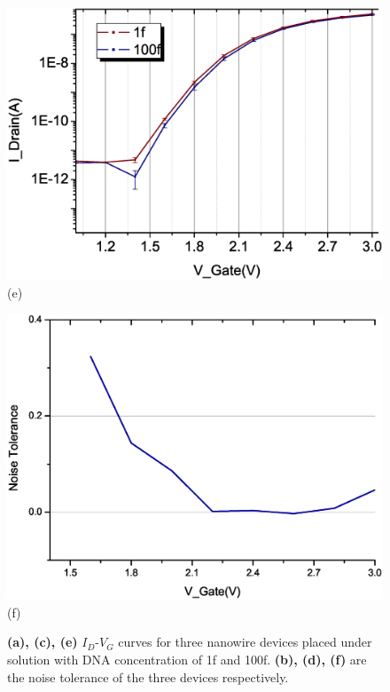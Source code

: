 \begin{figure}[!hbt]
\begin{minipage}[t][20cm][t]{1\textwidth}
\begin{minipage}[t]{0.5\textwidth}
            \includegraphics[scale=0.3]{images/chapter3/208_devices/L2-12_log.eps}
            (e)
        \end{minipage}
        \hfill
        \begin{minipage}[t]{0.5\textwidth}
            \raggedleft
            \includegraphics[scale=0.3]{images/chapter3/208_devices/L2-12_margin.eps}
            \centering
            (f)
        \end{minipage}
    \end{minipage}
    \caption{\textbf{(a), (c), (e)} $I_D$-$V_G$ curves for three nanowire devices placed under solution with DNA concentration of 1f and 100f.
                \textbf{(b), (d), (f)} are the noise tolerance of the three devices respectively.}
    \label{fig:SD_Device}
\end{figure}
